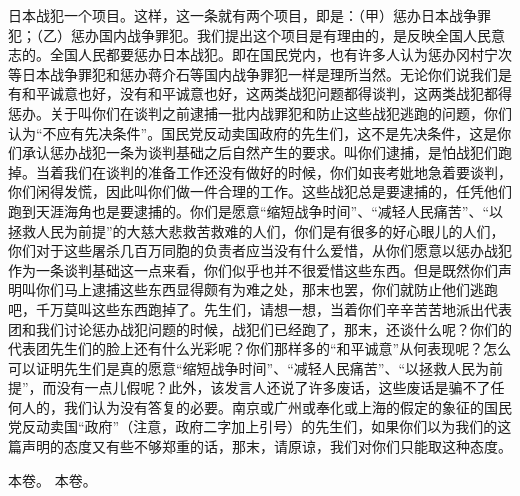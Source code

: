 日本战犯一个项目。这样，这一条就有两个项目，即是：（甲）惩办日本战争罪犯；（乙）惩办国内战争罪犯。我们提出这个项目是有理由的，是反映全国人民意志的。全国人民都要惩办日本战犯。即在国民党内，也有许多人认为惩办冈村宁次等日本战争罪犯和惩办蒋介石等国内战争罪犯一样是理所当然。无论你们说我们是有和平诚意也好，没有和平诚意也好，这两类战犯问题都得谈判，这两类战犯都得惩办。关于叫你们在谈判之前逮捕一批内战罪犯和防止这些战犯逃跑的问题，你们认为“不应有先决条件”。国民党反动卖国政府的先生们，这不是先决条件，这是你们承认惩办战犯一条为谈判基础之后自然产生的要求。叫你们逮捕，是怕战犯们跑掉。当着我们在谈判的准备工作还没有做好的时候，你们如丧考妣地急着要谈判，你们闲得发慌，因此叫你们做一件合理的工作。这些战犯总是要逮捕的，任凭他们跑到天涯海角也是要逮捕的。你们是愿意“缩短战争时间”、“减轻人民痛苦”、“以拯救人民为前提”的大慈大悲救苦救难的人们，你们是有很多的好心眼儿的人们，你们对于这些屠杀几百万同胞的负责者应当没有什么爱惜，从你们愿意以惩办战犯作为一条谈判基础这一点来看，你们似乎也并不很爱惜这些东西。但是既然你们声明叫你们马上逮捕这些东西显得颇有为难之处，那末也罢，你们就防止他们逃跑吧，千万莫叫这些东西跑掉了。先生们，请想一想，当着你们辛辛苦苦地派出代表团和我们讨论惩办战犯问题的时候，战犯们已经跑了，那末，还谈什么呢？你们的代表团先生们的脸上还有什么光彩呢？你们那样多的“和平诚意”从何表现呢？怎么可以证明先生们是真的愿意“缩短战争时间”、“减轻人民痛苦”、“以拯救人民为前提”，而没有一点儿假呢？此外，该发言人还说了许多废话，这些废话是骗不了任何人的，我们认为没有答复的必要。南京或广州或奉化或上海的假定的象征的国民党反动卖国“政府”（注意，政府二字加上引号）的先生们，如果你们以为我们的这篇声明的态度又有些不够郑重的话，那末，请原谅，我们对你们只能取这种态度。


\begin{maonote}
本卷。
本卷。
\end{maonote}

